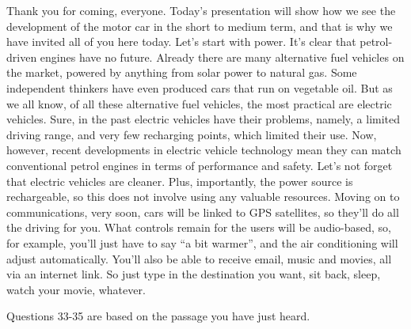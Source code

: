 \documentclass[12pt]{article}
\begin{document}
\vspace{0.00mm}
\setlength{\parindent}{0.00mm}
\setlength{\leftskip}{-6.23mm}
\setlength{\rightskip}{0.00mm}


\vspace{0.00mm}

\vspace{0.00mm}
\setlength{\parindent}{0.00mm}
\setlength{\leftskip}{-6.23mm}
\setlength{\rightskip}{0.00mm}

Thank you for coming, everyone. Today's presentation will show how we see the development of the motor car in the short to medium term, and that is why we have invited all of you here today. Let's start with power. It's clear that petrol-driven engines have no future. Already there are many alternative fuel vehicles on the market, powered by anything from solar power to natural gas. Some independent thinkers have even produced cars that run on vegetable oil. But as we all know, of all these alternative fuel vehicles, the most practical are electric vehicles. Sure, in the past electric vehicles have their problems, namely, a limited driving range, and very few recharging points, which limited their use. Now, however, recent developments in electric vehicle technology mean they can match conventional petrol engines in terms of performance and safety. Let's not forget that electric vehicles are cleaner. Plus, importantly, the power source is rechargeable, so this does not involve using any valuable resources. Moving on to communications, very soon, cars will be linked to GPS satellites, so they'll do all the driving for you. What controls remain for the users will be audio-based, so, for example, you'll just have to say ``a bit warmer'', and the air conditioning will adjust automatically. You'll also be able to receive email, music and movies, all via an internet link. So just type in the destination you want, sit back, sleep, watch your movie, whatever.
\vspace{0.00mm}

\vspace{0.00mm}
\setlength{\parindent}{0.00mm}
\setlength{\leftskip}{-6.23mm}
\setlength{\rightskip}{0.00mm}


\vspace{0.00mm}

\vspace{0.00mm}
\setlength{\parindent}{0.00mm}
\setlength{\leftskip}{-6.23mm}
\setlength{\rightskip}{0.00mm}

Questions 33-35 are based on the passage you have just heard.
\vspace{0.00mm}
\end{document}
